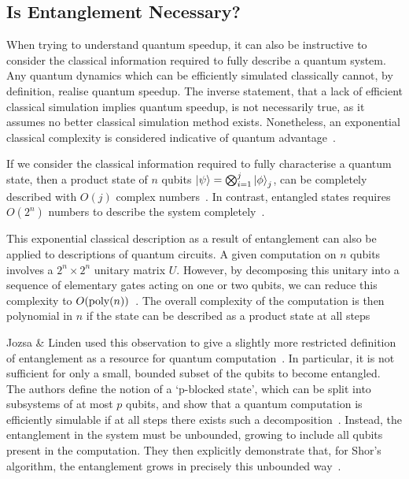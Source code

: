 \documentclass{standalone}
\begin{document}
\subsection{Is Entanglement Necessary?}\label{sec:classicalsim}
When trying to understand quantum speedup, it can also be instructive to consider the classical information required to fully describe a quantum system. Any quantum dynamics which can be efficiently simulated classically cannot, by definition, realise quantum speedup. The inverse statement, that a lack of efficient classical simulation implies quantum speedup, is not necessarily true, as it assumes no better classical simulation method exists. Nonetheless, an exponential classical complexity is considered indicative of quantum advantage~\cite{Jozsa2003}.
\par
If we consider the classical information required to fully characterise a quantum state, then a product state of $n$ qubits $\ket{\psi}=\bigotimes_{i=1}^{j}\ket{\phi}_{j}$, can be completely described with $O(j)$ complex numbers~\cite{Jozsa1997}. In contrast, entangled states requires $O(2^{n})$ numbers to describe the system completely~\cite{Jozsa1997}. 
\par
This exponential classical description as a result of entanglement can also be applied to descriptions of quantum circuits. A given computation on $n$ qubits involves a $2^{n}\times2^{n}$ unitary matrix $U$. However, by decomposing this unitary into a sequence of elementary gates acting on one or two qubits, we can reduce this complexity to $O(\text{poly}(n))$~\cite{Ekert1998}. The overall complexity of the computation is then polynomial in $n$ if the state can be described as a product state at all steps~\cite{Ekert1998} 
\par
Jozsa \& Linden used this observation to give a slightly more restricted definition of entanglement as a resource for quantum computation~\cite{Jozsa2003}. In particular, it is not sufficient for only a small, bounded subset of the qubits to become entangled. The authors define the notion of a `p-blocked state', which can be split into subsystems of at most $p$ qubits, and show that a quantum computation is efficiently simulable if at all steps there exists such a decomposition~\cite{Jozsa2003}. Instead, the entanglement in the system must be unbounded, growing to include all qubits present in the computation. They then explicitly demonstrate that, for Shor's algorithm, the entanglement grows in precisely this unbounded way~\cite{Jozsa2003}.
\end{document}
